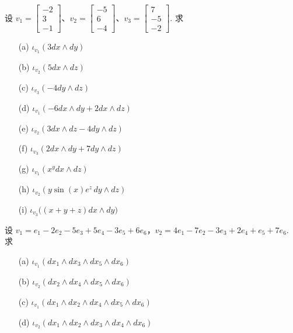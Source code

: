 \begin{question}\label{q:3-41}
设 $v_1=\begin{bmatrix}-2\\3\\-1\end{bmatrix}$、$v_2=\begin{bmatrix}-5\\6\\-4\end{bmatrix}$、$v_3=\begin{bmatrix}7\\-5\\-2\end{bmatrix}$. 求
\begin{enumerate}
  \item[(a)] $\iota_{v_1}(3dx\wedge dy)$
  \item[(b)] $\iota_{v_2}(5dx\wedge dz)$
  \item[(c)] $\iota_{v_3}(-4dy\wedge dz)$
  \item[(d)] $\iota_{v_1}(-6dx\wedge dy+2dx\wedge dz)$
  \item[(e)] $\iota_{v_2}(3dx\wedge dz-4dy\wedge dz)$
  \item[(f)] $\iota_{v_3}(2dx\wedge dy+7dy\wedge dz)$
  \item[(g)] $\iota_{v_1}\left(x^ydx\wedge dz\right)$
  \item[(h)] $\iota_{v_2}\left(y\sin(x)e^z\,dy\wedge dz\right)$
  \item[(i)] $\iota_{v_3}\bigl((x+y+z)dx\wedge dy\bigr)$
\end{enumerate}
\end{question}

\begin{question}\label{q:3-42}
设 $v_1=e_1-2e_2-5e_3+5e_4-3e_5+6e_6$，$v_2=4e_1-7e_2-3e_3+2e_4+e_5+7e_6$. 求
\begin{enumerate}
  \item[(a)] $\iota_{v_1}(dx_1\wedge dx_3\wedge dx_5\wedge dx_6)$
  \item[(b)] $\iota_{v_2}(dx_2\wedge dx_4\wedge dx_5\wedge dx_6)$
  \item[(c)] $\iota_{v_1}(dx_1\wedge dx_2\wedge dx_4\wedge dx_5\wedge dx_6)$
  \item[(d)] $\iota_{v_2}(dx_1\wedge dx_2\wedge dx_3\wedge dx_4\wedge dx_6)$
\end{enumerate}
\end{question}
